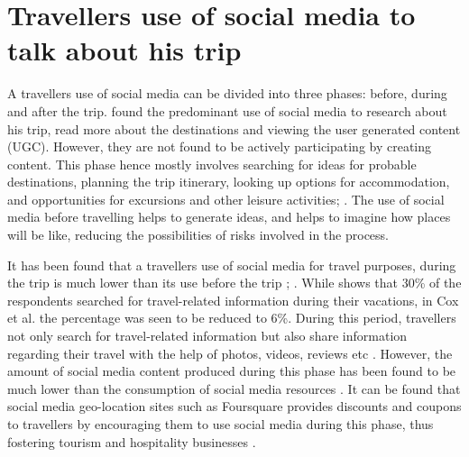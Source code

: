 \section{Traveller\textquotesingle s use of social media to talk about his trip}\label{1}


A traveller\textquotesingle s use of social media can be divided into three phases: before, during and after the trip. \cite{cox2009role} found the predominant use of social media to research about his trip, read more about the destinations and viewing the user generated content (UGC). However, they are not found to be actively participating by creating content. This phase hence mostly involves searching for ideas for probable destinations, planning the trip itinerary, looking up options for accommodation, and opportunities for excursions and other leisure activities\cite{cox2009role}; \cite{fotis2012social}. The use of social media before travelling helps to generate ideas, and helps to imagine how places will be like, reducing the possibilities of risks involved in the process.

It has been found that a traveller\textquotesingle s use of social media for travel purposes, during the trip is much lower than its use before the trip \cite{cox2009role}; \cite{fotis2012social}. While \cite{fotis2012social} shows that 30\% of the respondents searched for travel-related information during their vacations, in Cox et al.\cite{cox2009role} the percentage was seen to be reduced to 6\%. During this period, travellers not only search for travel-related information but also share information regarding their travel with the help of photos, videos, reviews etc \cite{Text100, 2013}. However, the amount of social media content produced during this phase has been found to be much lower than the consumption of social media resources \cite{fotis2012social}. It can be found that social media geo-location sites such as Foursquare provides discounts and coupons to travellers by encouraging them to use social media during this phase, thus fostering tourism and hospitality businesses \cite{hudson2013impact}.

